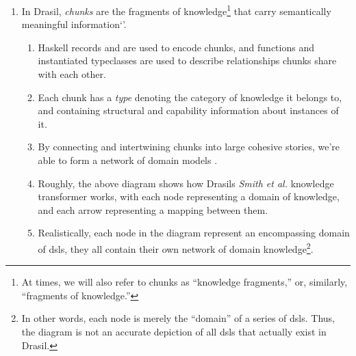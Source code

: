 \begin{enumerate}
\begin{enumerate}
                  \item Domain-specific abstractions create opportunities for
                        domain-specific \textit{interpretation and
                              transformation} (e.g., optimization, analysis, error
                        checking, tool support, etc.) \cite{Czarnecki2005}.

                  \item Drasil relies on a \textit{network of domains} (a
                        network of domain knowledge connected by \aclp{dsl}) to
                        enable the complex information transformation needed to
                        convert an \acs{srs} document into code.

            \end{enumerate}

      \item In Drasil, \textit{chunks} are the fragments of
            knowledge\footnote{At times, we will also refer to chunks as
                  ``knowledge fragments,'' or, similarly, ``fragments of knowledge.''}
            that carry semantically meaningful information`'.
            \begin{enumerate}
                  \item Haskell records and  are used to encode
                        chunks, and functions and instantiated typeclasses are
                        used to describe relationships chunks share with each
                        other.

                  \item Each chunk has a \textit{type} denoting the category of
                        knowledge it belongs to, and containing structural and
                        capability information about instances of it.

                  \item By connecting and intertwining chunks into large
                        cohesive stories, we're able to form a network of domain
                        models \cite{Czarnecki2005}.

                  \item Roughly, the above diagram shows how Drasils
                        \textit{Smith et al.} knowledge transformer works, with
                        each node representing a domain of knowledge, and each
                        arrow representing a mapping between them.

                  \item Realistically, each node in the diagram represent an
                        encompassing domain of \acsp{dsl}, they all contain
                        their own network of domain knowledge\footnote{In other
                              words, each node is merely the ``domain'' of a series of
                              \acsp{dsl}. Thus, the diagram is not an accurate
                              depiction of all \acsp{dsl} that actually exist in
                              Drasil.}.
            \end{enumerate}


\end{enumerate}
